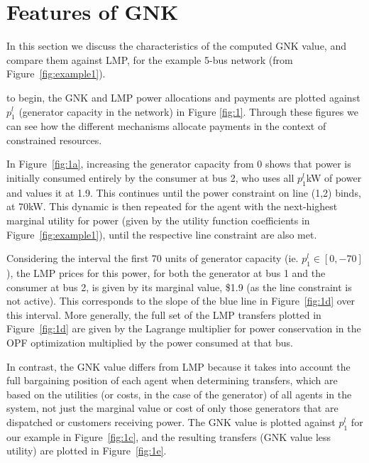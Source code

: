 \section{Features of GNK}\label{sec:features}

In this section we discuss the characteristics of the computed GNK value, and compare them against LMP, for the example 5-bus network (from Figure~\ref{fig:example1}).

to begin, the GNK and LMP power allocations and payments are plotted against $p_1^l$ (generator capacity in the network) in Figure \ref{fig:1}.
Through these figures we can see how the different mechanisms allocate payments in the context of constrained resources.

\iffigures
% 

\fi

In Figure~\ref{fig:1a}, increasing the generator capacity from $0$ shows that power is initially consumed entirely by the consumer at bus 2, 
who uses all $p_1^l$kW of power and values it at 1.9. This continues until the power constraint on line (1,2) binds, at 70kW.  
This dynamic is then repeated for the agent with the next-highest marginal utility for power (given by the utility function coefficients in Figure~\ref{fig:example1}), until the respective line constraint are also met.

Considering the interval the first 70 units of generator capacity (ie. $p_1^l \in [0,-70]$), the LMP prices for this power, for both the generator at bus 1 and the consumer at bus 2, is given by its marginal value, \$1.9 (as the line constraint is not active). This corresponds to the slope of the blue line in Figure~\ref{fig:1d} over this interval. 
More generally, the full set of the LMP transfers plotted in Figure~\ref{fig:1d} are given by the Lagrange multiplier for power conservation in the OPF optimization multiplied by the power consumed at that bus.

In contrast, the GNK value differs from LMP because it takes into account the full bargaining position of each agent when determining transfers, which are based on the utilities (or costs, in the case of the generator) of all agents in the system, 
not just the marginal value or cost of only those generators that are dispatched or customers receiving power. 
The GNK value is plotted against $p_1^l$ for our example in Figure~\ref{fig:1c}, and the resulting transfers (GNK value less utility) are plotted in Figure~\ref{fig:1e}.\\

